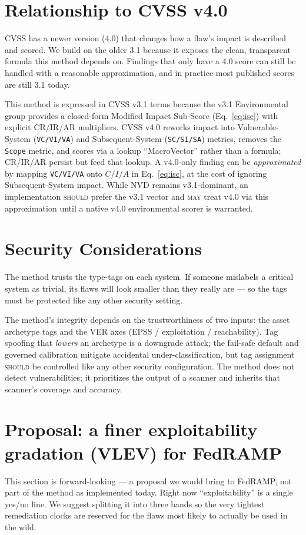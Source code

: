 \documentclass[11pt]{article}
\newcommand{\code}[1]{\texttt{#1}}
\newcommand{\rfckw}[1]{\textsc{#1}}
\begin{document}
\section{Relationship to CVSS v4.0}
\label{sec:v4}
\begin{plain}
CVSS has a newer version (4.0) that changes how a flaw's impact is described and
scored. We build on the older 3.1 because it exposes the clean, transparent formula
this method depends on. Findings that only have a 4.0 score can still be handled with
a reasonable approximation, and in practice most published scores are still 3.1
today.
\end{plain}
This method is expressed in CVSS v3.1 terms because the v3.1 Environmental group
provides a closed-form Modified Impact Sub-Score (Eq.~\eqref{eq:isc}) with explicit
CR/IR/AR multipliers. CVSS v4.0 reworks impact into Vulnerable-System
(\code{VC/VI/VA}) and Subsequent-System (\code{SC/SI/SA}) metrics, removes the
\code{Scope} metric, and scores via a lookup ``MacroVector'' rather than a formula;
CR/IR/AR persist but feed that lookup. A v4.0-only finding can be \emph{approximated}
by mapping \code{VC/VI/VA} onto $C/I/A$ in Eq.~\eqref{eq:isc}, at the cost of
ignoring Subsequent-System impact. While NVD remains v3.1-dominant, an
implementation \rfckw{should} prefer the v3.1 vector and \rfckw{may} treat v4.0 via
this approximation until a native v4.0 environmental scorer is warranted.

\section{Security Considerations}
\begin{plain}
The method trusts the type-tags on each system. If someone mislabels a critical
system as trivial, its flaws will look smaller than they really are --- so the tags
must be protected like any other security setting.
\end{plain}
The method's integrity depends on the trustworthiness of two inputs: the asset
archetype tags and the VER axes (EPSS / exploitation / reachability). Tag spoofing
that \emph{lowers} an archetype is a downgrade attack; the fail-safe default and
governed calibration mitigate accidental under-classification, but tag assignment
\rfckw{should} be controlled like any other security configuration. The method does
not detect vulnerabilities; it prioritizes the output of a scanner and inherits that
scanner's coverage and accuracy.

\section{Proposal: a finer exploitability gradation (VLEV) for FedRAMP}
\label{sec:proposal}
\begin{plain}
This section is forward-looking --- a proposal we would bring to FedRAMP, not part of
the method as implemented today. Right now ``exploitability'' is a single yes/no
line. We suggest splitting it into three bands so the very tightest remediation
clocks are reserved for the flaws most likely to actually be used in the wild.
\end{plain}
\end{document}
